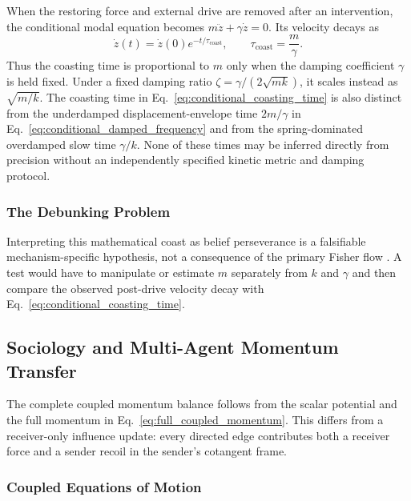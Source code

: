 \documentclass[12pt]{article}
\begin{document}
When the restoring force and external drive are removed after an intervention, the conditional modal equation becomes $m\ddot z+\gamma\dot z=0$.  Its velocity decays as
\begin{equation}
\dot z(t)=\dot z(0)e^{-t/\tau_{\mathrm{coast}}},
\qquad
\boxed{\tau_{\mathrm{coast}}=\frac{m}{\gamma}.}
\label{eq:conditional_coasting_time}
\end{equation}
Thus the coasting time is proportional to $m$ only when the damping coefficient $\gamma$ is held fixed.  Under a fixed damping ratio $\zeta=\gamma/(2\sqrt{mk})$, it scales instead as $\sqrt{m/k}$.  The coasting time in Eq.~\eqref{eq:conditional_coasting_time} is also distinct from the underdamped displacement-envelope time $2m/\gamma$ in Eq.~\eqref{eq:conditional_damped_frequency} and from the spring-dominated overdamped slow time $\gamma/k$.  None of these times may be inferred directly from precision without an independently specified kinetic metric and damping protocol.

\subsubsection{The Debunking Problem}

Interpreting this mathematical coast as belief perseverance is a falsifiable mechanism-specific hypothesis, not a consequence of the primary Fisher flow \citep{anderson1980perseverance}.  A test would have to manipulate or estimate $m$ separately from $k$ and $\gamma$ and then compare the observed post-drive velocity decay with Eq.~\eqref{eq:conditional_coasting_time}.


\subsection{Sociology and Multi-Agent Momentum Transfer}

The complete coupled momentum balance follows from the scalar potential and the full momentum in Eq.~\eqref{eq:full_coupled_momentum}.  This differs from a receiver-only influence update: every directed edge contributes both a receiver force and a sender recoil in the sender's cotangent frame.

\subsubsection{Coupled Equations of Motion}
\end{document}
